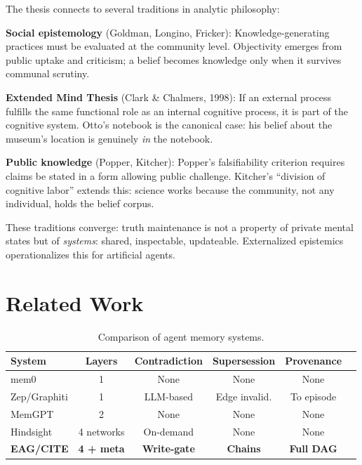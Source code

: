 \documentclass[11pt,letterpaper]{article}
\begin{document}
The thesis connects to several traditions in analytic philosophy:

\textbf{Social epistemology} (Goldman, Longino, Fricker): Knowledge-generating practices must be evaluated at the community level. Objectivity emerges from public uptake and criticism; a belief becomes knowledge only when it survives communal scrutiny.

\textbf{Extended Mind Thesis} (Clark \& Chalmers, 1998): If an external process fulfills the same functional role as an internal cognitive process, it is part of the cognitive system. Otto's notebook is the canonical case: his belief about the museum's location is genuinely \textit{in} the notebook.

\textbf{Public knowledge} (Popper, Kitcher): Popper's falsifiability criterion requires claims be stated in a form allowing public challenge. Kitcher's ``division of cognitive labor'' extends this: science works because the community, not any individual, holds the belief corpus.

These traditions converge: truth maintenance is not a property of private mental states but of \textit{systems}: shared, inspectable, updateable. Externalized epistemics operationalizes this for artificial agents.

\section{Related Work}

\begin{table}[H]
\centering
\caption{Comparison of agent memory systems.}
\label{tab:comparison}
\begin{tabular}{@{}lccccc@{}}
\toprule
\textbf{System} & \textbf{Layers} & \textbf{Contradiction} & \textbf{Supersession} & \textbf{Provenance} \\
\midrule
mem0 & 1 & None & None & None \\
Zep/Graphiti & 1 & LLM-based & Edge invalid. & To episode \\
MemGPT & 2 & None & None & None \\
Hindsight & 4 networks & On-demand & None & None \\
\textbf{EAG/CITE} & \textbf{4 + meta} & \textbf{Write-gate} & \textbf{Chains} & \textbf{Full DAG} \\
\bottomrule
\end{tabular}
\end{table}
\end{document}
